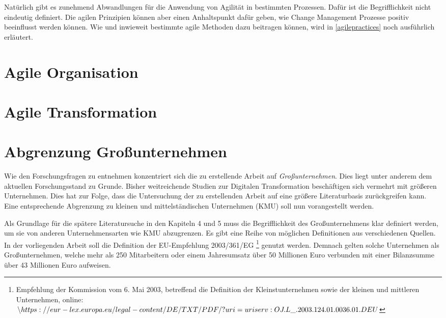 
Natürlich gibt es zunehmend Abwandlungen für die Anwendung von Agilität in bestimmten Prozessen. Dafür ist die Begrifflichkeit nicht eindeutig definiert. Die agilen Prinzipien können aber einen Anhaltspunkt dafür geben, wie Change Management Prozesse positiv  beeinflusst werden können. Wie und inwieweit bestimmte agile Methoden dazu beitragen können, wird in \ref{agilepractices} noch ausführlich erläutert.

\todots

\section{Agile Organisation}
\label{background:agileorganisation}


\todots

\section{Agile Transformation}

\todots

\section{Abgrenzung Großunternehmen}

Wie den Forschungsfragen zu entnehmen konzentriert sich die zu erstellende Arbeit auf \textit{Großunternehmen}. Dies liegt unter anderem dem aktuellen Forschungsstand zu Grunde. Bisher weitreichende Studien zur Digitalen Transformation beschäftigen sich vermehrt mit größeren Unternehmen. Dies hat zur Folge, dass die Untersuchung der zu erstellenden Arbeit auf eine größere Literaturbasis zurückgreifen kann. Eine entsprechende Abgrenzung zu kleinen und mittelständischen Unternehmen (KMU) soll nun vorangestellt werden.

Als Grundlage für die spätere Literatursuche in den Kapiteln 4 und 5 muss die Begrifflichkeit  des Großunternehmens  klar definiert werden, um sie von anderen Unternehmensarten wie KMU abzugrenzen. Es gibt eine Reihe von möglichen Definitionen aus verschiedenen Quellen. In der vorliegenden Arbeit soll die Definition der EU-Empfehlung 2003/361/EG \footnote{Empfehlung der Kommission vom 6. Mai 2003, betreffend die Definition der Kleinstunternehmen sowie der kleinen und mittleren Unternehmen, online: $\url{https://eur-lex.europa.eu/legal-content/DE/TXT/PDF/?uri=uriserv:OJ.L_.2003.124.01.0036.01.DEU}$} genutzt werden. Demnach gelten solche Unternehmen als Großunternehmen, welche mehr als 250 Mitarbeitern oder einem Jahresumsatz über 50 Millionen Euro verbunden mit einer Bilanzsumme über 43 Millionen Euro aufweisen.

